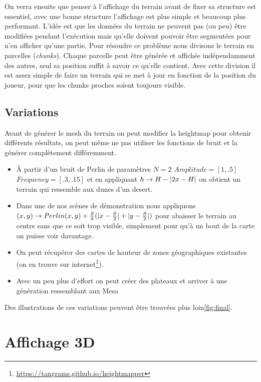 \documentclass{EPUProjetDi}
\DeclarePairedDelimiter\abs{\lvert}{\rvert}%
\begin{document}
On verra ensuite que penser à l'affichage du terrain avant de fixer sa structure est essentiel, avec une bonne structure l'affichage est plus simple et beaucoup plus performant. L'idée est que les données du terrain ne peuvent pas (ou peu) être modifiées pendant l'exécution mais qu'elle doivent pouvoir être segmentées pour n'en afficher qu'une partie.
Pour résoudre ce problème nous divisons le terrain en parcelles (\textit{chunks}). Chaque parcelle peut être générée et affichée indépendamment des autres, seul sa position suffit à savoir ce qu'elle contient.
Avec cette division il est assez simple de faire un terrain qui se met à jour en fonction de la position du joueur, pour que les chunks proches soient toujours visible.




\section{Variations}

Avant de générer le mesh du terrain on peut modifier la heightmap pour obtenir différents résultats, on peut même ne pas utiliser les fonctions de bruit et la générer complètement différemment.

\begin{itemize}
	\item{À partir d'un bruit de Perlin de paramètres $N=2$ $Amplitude=[1, .5]$ $Frequency=[.3, .15]$ et en appliquant $h\rightarrow H-\abs{2x-H}$ on obtient un terrain qui ressemble aux dunes d'un desert.}
	\item{Dans une de nos scènes de démonstration nous appliquons $(x,y)\rightarrow Perlin(x,y)+\frac{S}{8}(\abs{x-\frac{S}{2}}+\abs{y-\frac{S}{2}})$ pour abaisser le terrain au centre sans que ce soit trop visible, simplement pour qu'à un bout de la carte on puisse voir davantage.}
	\item{On peut récupérer des cartes de hauteur de zones géographiques existantes (on en trouve sur internet\footnote{\url{https://tangrams.github.io/heightmapper}}).}
	\item{Avec un peu plus d'effort on peut créer des plateaux et arriver à une génération ressemblant aux Mesa}
\end{itemize}

Des illustrations de ces variations peuvent être trouvées plus loin\ref{fig:final}.


\chapter{Affichage 3D}
\end{document}
